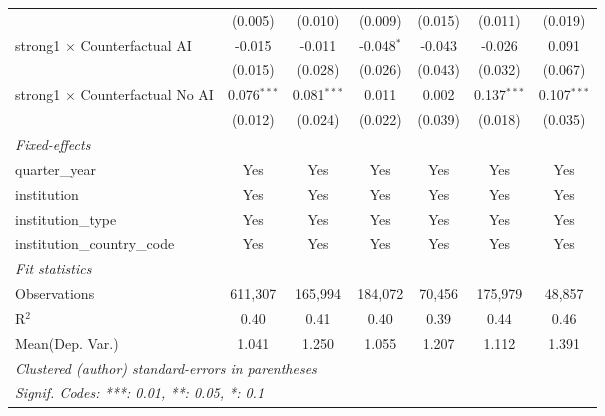 \begin{tabular}{lcccccc}
                                          & (0.005)       & (0.010)       & (0.009)       & (0.015)       & (0.011)       & (0.019)\\   
   strong1 $\times$ Counterfactual AI     & -0.015        & -0.011        & -0.048$^{*}$  & -0.043        & -0.026        & 0.091\\   
                                          & (0.015)       & (0.028)       & (0.026)       & (0.043)       & (0.032)       & (0.067)\\   
   strong1 $\times$ Counterfactual No AI  & 0.076$^{***}$ & 0.081$^{***}$ & 0.011         & 0.002         & 0.137$^{***}$ & 0.107$^{***}$\\   
                                          & (0.012)       & (0.024)       & (0.022)       & (0.039)       & (0.018)       & (0.035)\\   
   \midrule
   \emph{Fixed-effects}\\
   quarter\_year                          & Yes           & Yes           & Yes           & Yes           & Yes           & Yes\\  
   institution                            & Yes           & Yes           & Yes           & Yes           & Yes           & Yes\\  
   institution\_type                      & Yes           & Yes           & Yes           & Yes           & Yes           & Yes\\  
   institution\_country\_code             & Yes           & Yes           & Yes           & Yes           & Yes           & Yes\\  
   \midrule
   \emph{Fit statistics}\\
   Observations                           & 611,307       & 165,994       & 184,072       & 70,456        & 175,979       & 48,857\\  
   R$^2$                                  & 0.40          & 0.41          & 0.40          & 0.39          & 0.44          & 0.46\\  
Mean(Dep. Var.) & 1.041 & 1.250 & 1.055 & 1.207 & 1.112 & 1.391 \\
   \midrule \midrule
   \multicolumn{7}{l}{\emph{Clustered (author) standard-errors in parentheses}}\\
   \multicolumn{7}{l}{\emph{Signif. Codes: ***: 0.01, **: 0.05, *: 0.1}}\\
\end{tabular}
\par\endgroup
